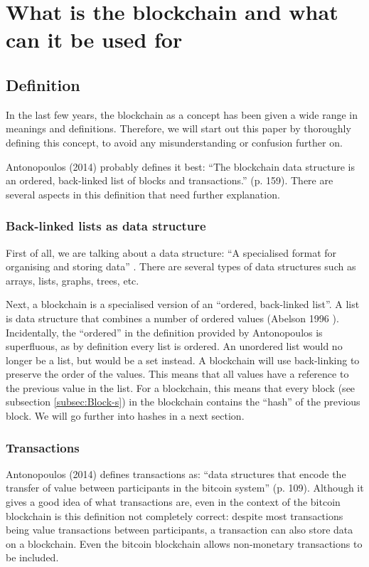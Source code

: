 \chapter{What is the blockchain and what can it be used for}

\section{Definition}
In the last few years, the blockchain as a concept has been given a wide range in meanings and definitions. Therefore, we will start out this paper by thoroughly defining this concept, to avoid any misunderstanding or confusion further on.

Antonopoulos (2014) \cite{antonopoulos:2014} probably defines it best: ``The blockchain data structure is an ordered, back-linked list of blocks and transactions.'' (p. 159). There are several aspects in this definition that need further explanation.

\subsection{Back-linked lists as data structure}

First of all, we are talking about a data structure: ``A specialised format for organising and storing data'' \cite{data-structure}. There are several types of data structures such as arrays, lists, graphs, trees, etc.

Next, a blockchain is a specialised version of an ``ordered, back-linked list''. A list is data structure that combines a number of ordered values (Abelson 1996 \cite{abelson:1996}).  Incidentally, the ``ordered'' in the definition provided by Antonopoulos is superfluous, as by definition every list is ordered. An unordered list would no longer be a list, but would be a set instead. A blockchain will use back-linking to preserve the order of the values. This means that all values have a reference to the previous value in the list. For a blockchain, this means that every block (see subsection \ref{subsec:Block-s}) in the blockchain contains the ``hash'' of the previous block. We will go further into hashes in a next section.

\subsection{Transactions}

Antonopoulos (2014) \cite{antonopoulos:2014} defines transactions as: ``data structures that encode the transfer of value between participants in the bitcoin system'' (p. 109). Although it gives a good idea of what transactions are, even in the context of the bitcoin blockchain is this definition not completely correct: despite most transactions being value transactions between participants, a transaction can also store data on a blockchain. Even the bitcoin blockchain allows non-monetary transactions to be included.

